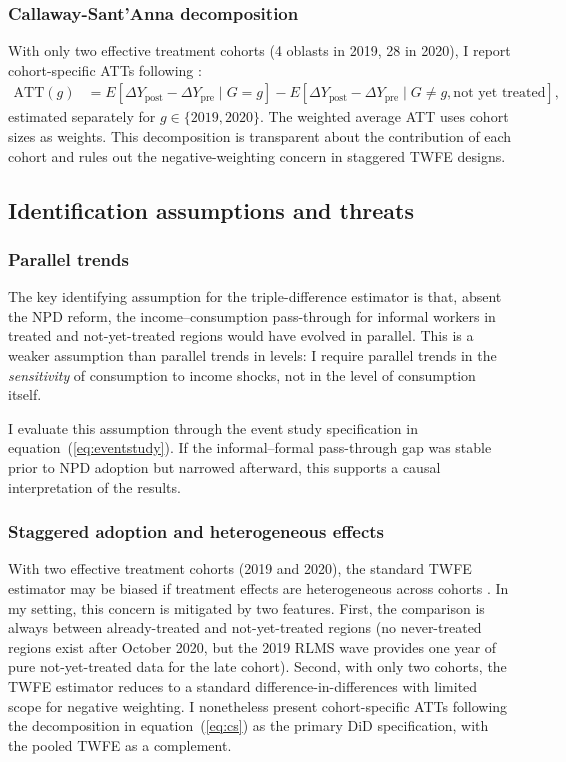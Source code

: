 \documentclass[12pt]{article}
\begin{document}
\subsubsection{Callaway-Sant'Anna decomposition}

With only two effective treatment cohorts (4 oblasts in 2019, 28 in 2020), I report cohort-specific ATTs following \citet{CallawayS2021}:
\begin{align}\label{eq:cs}
\text{ATT}(g) &= E[\Delta Y_{\text{post}} - \Delta Y_{\text{pre}} \mid G = g] - E[\Delta Y_{\text{post}} - \Delta Y_{\text{pre}} \mid G \neq g, \text{not yet treated}],
\end{align}
estimated separately for $g \in \{2019, 2020\}$. The weighted average ATT uses cohort sizes as weights. This decomposition is transparent about the contribution of each cohort and rules out the negative-weighting concern in staggered TWFE designs.

\subsection{Identification assumptions and threats}

\subsubsection{Parallel trends}

The key identifying assumption for the triple-difference estimator is that, absent the NPD reform, the income--consumption pass-through for informal workers in treated and not-yet-treated regions would have evolved in parallel. This is a weaker assumption than parallel trends in levels: I require parallel trends in the \textit{sensitivity} of consumption to income shocks, not in the level of consumption itself.

I evaluate this assumption through the event study specification in equation~(\ref{eq:eventstudy}). If the informal--formal pass-through gap was stable prior to NPD adoption but narrowed afterward, this supports a causal interpretation of the results.

\subsubsection{Staggered adoption and heterogeneous effects}

With two effective treatment cohorts (2019 and 2020), the standard TWFE estimator may be biased if treatment effects are heterogeneous across cohorts \citep{CallawayS2021, SunAbraham2021}. In my setting, this concern is mitigated by two features. First, the comparison is always between already-treated and not-yet-treated regions (no never-treated regions exist after October 2020, but the 2019 RLMS wave provides one year of pure not-yet-treated data for the late cohort). Second, with only two cohorts, the TWFE estimator reduces to a standard difference-in-differences with limited scope for negative weighting. I nonetheless present cohort-specific ATTs following the \citet{CallawayS2021} decomposition in equation~(\ref{eq:cs}) as the primary DiD specification, with the pooled TWFE as a complement.
\end{document}
